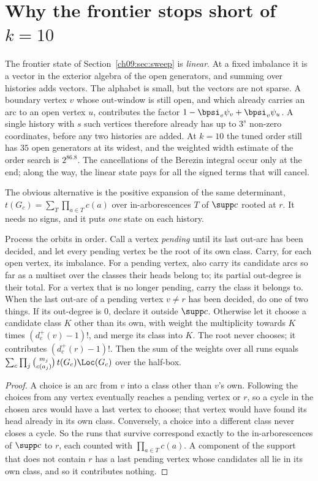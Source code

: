 \section{\texorpdfstring{Why the frontier stops short of $k=10$}{Why the frontier stops short of k=10}}\label{ch09:sec:wall}

The frontier state of Section~\ref{ch09:sec:sweep} is \emph{linear}. At a fixed imbalance it is a
vector in the exterior algebra of the open generators, and summing over histories adds vectors.
The alphabet is small, but the vectors are not sparse. A boundary vertex $v$ whose out-window
is still open, and which already carries an arc to an open vertex $u$, contributes the factor
$1-\bpsi_v\psi_v+\bpsi_v\psi_u$. A single history with $s$ such vertices therefore already has
up to $3^{s}$ non-zero coordinates, before any two histories are added. At $k=10$ the tuned
order still has $35$ open generators at its widest, and the weighted width estimate of the
order search is $2^{86.8}$. The cancellations of the Berezin integral occur only at the end;
along the way, the linear state pays for all the signed terms that will cancel.

The obvious alternative is the positive expansion of the same determinant,
$t(G_c)=\sum_T\prod_{a\in T}c(a)$ over in-arborescences $T$ of $\supp c$ rooted at $r$. It needs
no signs, and it puts \emph{one} state on each history.

\begin{proposition}\label{ch09:prop:arbor}
Process the orbits in order. Call a vertex \emph{pending} until its last out-arc has been
decided, and let every pending vertex be the root of its own class. Carry, for each open vertex,
its imbalance. For a pending vertex, also carry its candidate arcs so far as a multiset over the
classes their heads belong to; its partial out-degree is their total. For a vertex that is no
longer pending, carry the class it belongs to. When the last out-arc of a pending vertex
$v\ne r$ has been decided, do one of two things. If its out-degree is $0$, declare it outside
$\supp c$. Otherwise let it choose a candidate class $K$ other than its own, with weight the
multiplicity towards $K$ times $(d^+_c(v)-1)!$, and merge its class into $K$. The root never
chooses; it contributes $(d^+_c(r)-1)!$. Then the sum of the weights over all runs equals
$\sum_c\prod_j\binom{m_j}{c(a_j)}\,t(G_c)\Loc(G_c)$ over the half-box.
\end{proposition}

\begin{proof}
A choice is an arc from $v$ into a class other than $v$'s own. Following the choices from any
vertex eventually reaches a pending vertex or $r$, so a cycle in the chosen arcs would have a
last vertex to choose; that vertex would have found its head already in its own class.
Conversely, a choice into a different class never closes a cycle. So the runs that survive
correspond exactly to the in-arborescences of $\supp c$ to $r$, each counted with
$\prod_{a\in T}c(a)$. A component of the support that does not contain $r$ has a last pending
vertex whose candidates all lie in its own class, and so it contributes nothing.
\end{proof}

